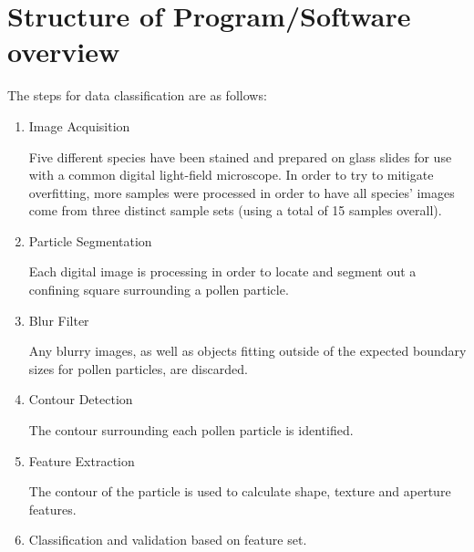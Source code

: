 \section{Structure of Program/Software overview} 

The steps for data classification are as follows:
\begin{enumerate}
\item Image Acquisition

Five different species have been stained and prepared on glass slides for use with a common digital light-field microscope.  In order to try to mitigate  overfitting, more samples were processed in order to have all species' images come from three distinct sample sets (using a total of 15 samples overall). 

\item Particle Segmentation

Each digital image is processing in order to locate and segment out a confining square surrounding a pollen particle.

\item Blur Filter

Any blurry images, as well as objects fitting outside of the expected boundary sizes for pollen particles, are discarded.

\item Contour Detection

The contour surrounding each pollen particle is identified.

\item Feature Extraction

The contour of the particle is used to calculate shape, texture and aperture features.

\item Classification and validation based on feature set.

\end{enumerate}
    
    
    
    
    
    
    
    
    
    
    
    
    
    
    
  
  
  
  
  